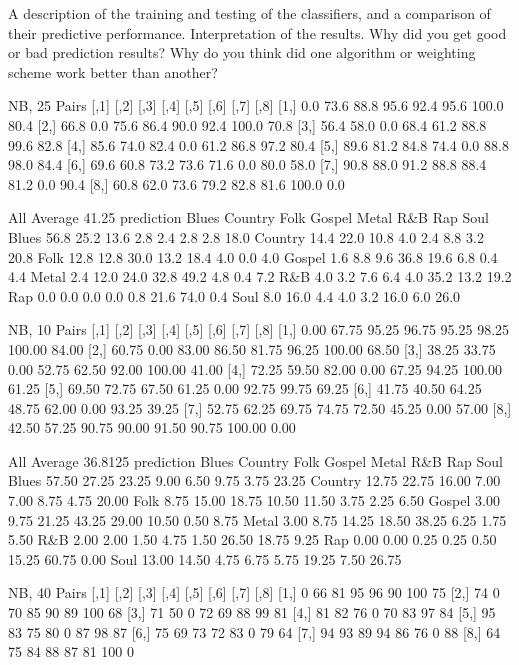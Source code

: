 \documentclass[a4paper,oneside]{article}
\begin{document}
A description of the training and testing of the classifiers, and a comparison of their predictive performance.
Interpretation of the results. Why did you get good or bad prediction results? Why do you think did one algorithm or weighting scheme work better than another?

NB, 25
Pairs
     [,1] [,2] [,3] [,4] [,5] [,6]  [,7] [,8]
[1,]  0.0 73.6 88.8 95.6 92.4 95.6 100.0 80.4
[2,] 66.8  0.0 75.6 86.4 90.0 92.4 100.0 70.8
[3,] 56.4 58.0  0.0 68.4 61.2 88.8  99.6 82.8
[4,] 85.6 74.0 82.4  0.0 61.2 86.8  97.2 80.4
[5,] 89.6 81.2 84.8 74.4  0.0 88.8  98.0 84.4
[6,] 69.6 60.8 73.2 73.6 71.6  0.0  80.0 58.0
[7,] 90.8 88.0 91.2 88.8 88.4 81.2   0.0 90.4
[8,] 60.8 62.0 73.6 79.2 82.8 81.6 100.0  0.0

All
Average 41.25
prediction Blues Country Folk Gospel Metal  R\&B  Rap Soul
   Blues    56.8    25.2 13.6    2.8   2.4  2.8  2.8 18.0
   Country  14.4    22.0 10.8    4.0   2.4  8.8  3.2 20.8
   Folk     12.8    12.8 30.0   13.2  18.4  4.0  0.0  4.0
   Gospel    1.6     8.8  9.6   36.8  19.6  6.8  0.4  4.4
   Metal     2.4    12.0 24.0   32.8  49.2  4.8  0.4  7.2
   R\&B       4.0     3.2  7.6    6.4   4.0 35.2 13.2 19.2
   Rap       0.0     0.0  0.0    0.0   0.8 21.6 74.0  0.4
   Soul      8.0    16.0  4.4    4.0   3.2 16.0  6.0 26.0

NB, 10
Pairs
      [,1]  [,2]  [,3]  [,4]  [,5]  [,6]   [,7]  [,8]
[1,]  0.00 67.75 95.25 96.75 95.25 98.25 100.00 84.00
[2,] 60.75  0.00 83.00 86.50 81.75 96.25 100.00 68.50
[3,] 38.25 33.75  0.00 52.75 62.50 92.00 100.00 41.00
[4,] 72.25 59.50 82.00  0.00 67.25 94.25 100.00 61.25
[5,] 69.50 72.75 67.50 61.25  0.00 92.75  99.75 69.25
[6,] 41.75 40.50 64.25 48.75 62.00  0.00  93.25 39.25
[7,] 52.75 62.25 69.75 74.75 72.50 45.25   0.00 57.00
[8,] 42.50 57.25 90.75 90.00 91.50 90.75 100.00  0.00

All
Average 36.8125
prediction Blues Country  Folk Gospel Metal   R\&B   Rap  Soul
   Blues   57.50   27.25 23.25   9.00  6.50  9.75  3.75 23.25
   Country 12.75   22.75 16.00   7.00  7.00  8.75  4.75 20.00
   Folk     8.75   15.00 18.75  10.50 11.50  3.75  2.25  6.50
   Gospel   3.00    9.75 21.25  43.25 29.00 10.50  0.50  8.75
   Metal    3.00    8.75 14.25  18.50 38.25  6.25  1.75  5.50
   R\&B      2.00    2.00  1.50   4.75  1.50 26.50 18.75  9.25
   Rap      0.00    0.00  0.25   0.25  0.50 15.25 60.75  0.00
   Soul    13.00   14.50  4.75   6.75  5.75 19.25  7.50 26.75

NB, 40
Pairs
     [,1] [,2] [,3] [,4] [,5] [,6] [,7] [,8]
[1,]    0   66   81   95   96   90  100   75
[2,]   74    0   70   85   90   89  100   68
[3,]   71   50    0   72   69   88   99   81
[4,]   81   82   76    0   70   83   97   84
[5,]   95   83   75   80    0   87   98   87
[6,]   75   69   73   72   83    0   79   64
[7,]   94   93   89   94   86   76    0   88
[8,]   64   75   84   88   87   81  100    0
\end{document}
